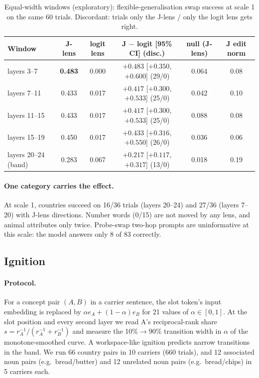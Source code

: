 \documentclass[11pt]{article}
\theoremstyle{definition}
\begin{document}
\begin{table}[t]
\centering
\caption{Equal-width windows (exploratory): flexible-generalisation swap success at scale 1 on the same
60 trials. Discordant: trials only the J-lens / only the logit lens gets right.}
\label{tab:windows}
\small
\begin{tabular}{lccccc}
\toprule
Window & J-lens & logit lens & J $-$ logit [95\% CI] (disc.) & null (J-lens) & J edit norm \\
\midrule
layers 3--7 & \textbf{0.483} & 0.000 & $+0.483$ [$+0.350$, $+0.600$] (29/0) & 0.064 & 0.08 \\
layers 7--11 & 0.433 & 0.017 & $+0.417$ [$+0.300$, $+0.533$] (25/0) & 0.042 & 0.10 \\
layers 11--15 & 0.433 & 0.017 & $+0.417$ [$+0.300$, $+0.533$] (25/0) & 0.088 & 0.08 \\
layers 15--19 & 0.450 & 0.017 & $+0.433$ [$+0.316$, $+0.550$] (26/0) & 0.036 & 0.06 \\
layers 20--24 (band) & 0.283 & 0.067 & $+0.217$ [$+0.117$, $+0.317$] (13/0) & 0.018 & 0.19 \\
\bottomrule
\end{tabular}
\end{table}

\paragraph{One category carries the effect.} At scale 1, countries succeed on 16/36 trials (layers
20--24) and 27/36 (layers 7--20) with J-lens directions. Number words (0/15) are not moved by any lens,
and animal attributes only twice. Probe-swap two-hop prompts are uninformative at this scale: the
model answers only 8 of 83 correctly.

\subsection{Ignition}
\label{sec:ignition}

\paragraph{Protocol.} For a concept pair $(A,B)$ in a carrier sentence, the slot token's input
embedding is replaced by $\alpha e_A+(1-\alpha)e_B$ for 21 values of $\alpha\in[0,1]$. At the slot
position and every second layer we read A's reciprocal-rank share
$s=r_A^{-1}/(r_A^{-1}+r_B^{-1})$ and measure the 10\%$\to$90\% transition width in $\alpha$ of the
monotone-smoothed curve. A workspace-like ignition predicts narrow transitions in the band. We run 66
country pairs in 10 carriers (660 trials), and 12 associated noun pairs (e.g.\ bread/butter) and 12
unrelated noun pairs (e.g.\ bread/chips) in 5 carriers each.
\end{document}
